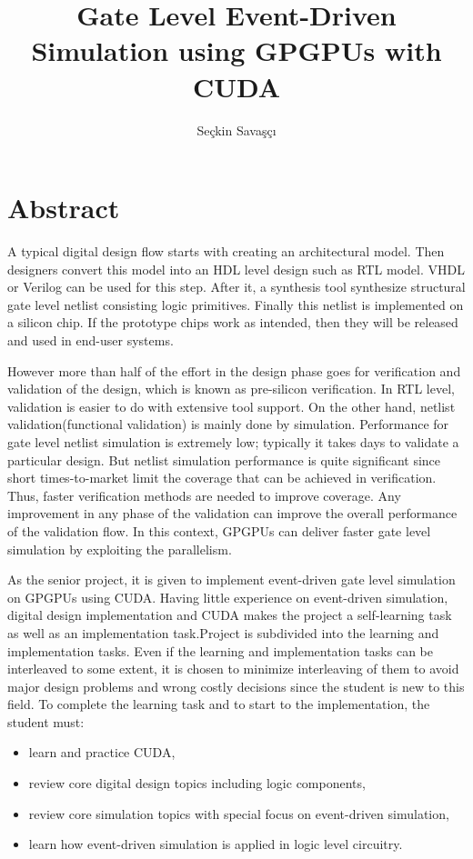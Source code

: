 \documentclass[a4paper,onesided,12pt]{report}
\title{Gate Level Event-Driven Simulation using GPGPUs with CUDA}
\author{Seçkin Savaşçı}
\begin{document}
\makebstitle %
\makeapprovalpage

\tableofcontents
\newpage

\chapter{Abstract}
\label{chapter:Abstract}
 A typical digital design flow starts with creating an architectural model. Then designers convert this model into an HDL level design such as RTL model. VHDL or Verilog can be used for this step. After it, a synthesis tool synthesize structural gate level netlist consisting logic primitives. Finally this netlist is implemented on a silicon chip. If the prototype chips work as intended, then they will be released and used in end-user systems.
 
  
 However more than half of the effort in the design phase goes for verification and validation of the design, which is known as pre-silicon verification. In RTL level, validation is easier to do with extensive tool support. On the other hand, netlist validation(functional validation) is mainly done by simulation. Performance for gate level netlist simulation is extremely low; typically it takes days to validate a particular design. But netlist simulation performance is quite significant since short times-to-market limit the coverage that can be achieved in verification. Thus, faster verification methods are needed to improve coverage. Any improvement in any phase of the validation can improve the overall performance of the validation flow. In this context, GPGPUs can deliver faster gate level simulation by exploiting the parallelism. 
 
 
 As the senior project, it is given to implement event-driven gate level simulation on GPGPUs using CUDA. Having little experience on event-driven simulation, digital design implementation and CUDA makes the project a self-learning task as well as an implementation task.Project is subdivided into the learning and implementation tasks. Even if the learning and implementation tasks can be interleaved to some extent, it is chosen to minimize interleaving of them to avoid major design problems and wrong costly decisions since the student is new to this field. To complete the learning task and to start to the implementation, the student must:
 \begin{itemize}
 \item learn and practice CUDA, 
 \item review core digital design topics including logic components,
 \item review core simulation topics with special focus on event-driven simulation,
 \item learn how event-driven simulation is applied in logic level circuitry. 
 \end{itemize} 
 
\end{document}
